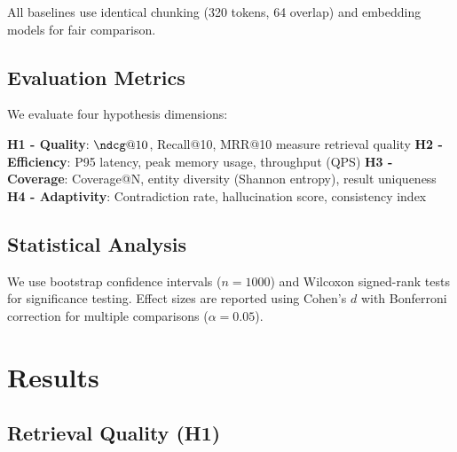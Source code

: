 \documentclass[letterpaper]{article}
\begin{document}
All baselines use identical chunking (320 tokens, 64 overlap) and embedding models for fair comparison.

\subsection{Evaluation Metrics}

We evaluate four hypothesis dimensions:

\textbf{H1 - Quality}: $\ndcg@10$, Recall@10, MRR@10 measure retrieval quality
\textbf{H2 - Efficiency}: P95 latency, peak memory usage, throughput (QPS)
\textbf{H3 - Coverage}: Coverage@N, entity diversity (Shannon entropy), result uniqueness
\textbf{H4 - Adaptivity}: Contradiction rate, hallucination score, consistency index

\subsection{Statistical Analysis}

We use bootstrap confidence intervals ($n=1000$) and Wilcoxon signed-rank tests for significance testing. Effect sizes are reported using Cohen's $d$ with Bonferroni correction for multiple comparisons ($\alpha = 0.05$).

\section{Results}

\subsection{Retrieval Quality (H1)}
\end{document}

